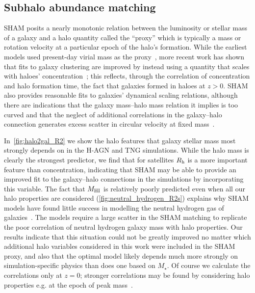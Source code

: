 \documentclass[usenatbib,useAMS]{mnras}
\begin{document}
\subsection{Subhalo abundance matching}\label{sec:abundance_match}

SHAM posits a nearly monotonic relation between the luminosity or stellar mass of a galaxy and a halo quantity called the ``proxy'' which is typically a mass or rotation velocity at a particular epoch of the halo's formation. While the earliest models used present-day virial mass as the proxy~\citep{Conroy2006, Moster2010, Behroozi_2010}, more recent work has shown that fits to galaxy clustering are improved by instead using a quantity that scales with haloes' concentration~\citep{Reddick2013, Lehmann2017}; this reflects, through the correlation of concentration and halo formation time, the fact that galaxies formed in haloes at $z>0$. SHAM also provides reasonable fits to galaxies' dynamical scaling relations, although there are indications that the galaxy mass--halo mass relation it implies is too curved and that the neglect of additional correlations in the galaxy--halo connection generates excess scatter in circular velocity at fixed mass~\citep{Trujillo, Desmond_Wechsler_2015, Desmond_Wechsler_2017, Desmond_MDAR, Desmond_BTFR, Li_2022}.

In~\cref{fig:halo2gal_R2} we show the halo features that galaxy stellar mass most strongly depends on in the H-AGN and TNG simulations. While the halo mass is clearly the strongest predictor, we find that for satellites $R_{\rm h}$ is a more important feature than concentration, indicating that SHAM may be able to provide an improved fit to the galaxy--halo connections in the simulations by incorporating this variable. The fact that $M_{\rm HI}$ is relatively poorly predicted even when all our halo properties are considered (\cref{fig:neutral_hydrogen_R2s}) explains why SHAM models have found little success in modelling the neutral hydrogen gas of galaxies~\citep{Guo, Stiskalek2021, Dutta2021}.
The models require a large scatter in the SHAM matching to replicate the poor correlation of neutral hydrogen galaxy mass with halo properties. Our results indicate that this situation could not be greatly improved no matter which additional halo variables considered in this work were included in the SHAM proxy, and also that the optimal model likely depends much more strongly on simulation-specific physics than does one based on $M_\star$. Of course we calculate the correlations only at $z=0$; stronger correlations may be found by considering halo properties e.g. at the epoch of peak mass~\citep{McGibbon}.
\end{document}
